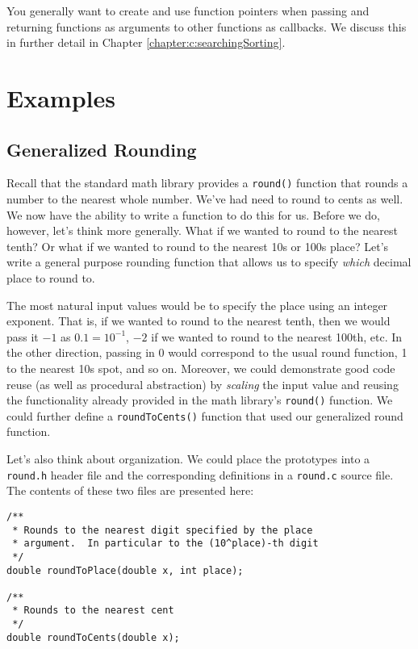 You generally want to create and use function pointers when
passing and returning functions as arguments to other
functions as callbacks.  We discuss this in further detail
in Chapter \ref{chapter:c:searchingSorting}.

\section{Examples}

\subsection{Generalized Rounding}

Recall that the standard math library provides a \texttt{round()}
function that rounds a number to the nearest whole number.  We've
had need to round to cents as well.  We now have the ability to write
a function to do this for us.  Before we do, however, let's think more
generally.  What if we wanted to round to the nearest tenth?  Or
what if we wanted to round to the nearest 10s or 100s place?  Let's
write a general purpose rounding function that allows us to specify
\emph{which} decimal place to round to.  

The most natural input values would be to specify the place using
an integer exponent.  That is, if we wanted to round to the nearest
tenth, then we would pass it $-1$ as $0.1 = 10^{-1}$, $-2$ if we wanted
to round to the nearest 100th, etc.  In the other direction, passing in 0
would correspond to the usual round function, 1 to the nearest 10s spot, 
and so on.  Moreover, we could demonstrate good code reuse (as well as 
 procedural
abstraction) by \emph{scaling} the input value and reusing the functionality
already provided in the math library's \texttt{round()} function.  We
could further define a \texttt{roundToCents()} function that used 
our generalized round function.

Let's also think about organization.  We could place the prototypes into
a \texttt{round.h} header file and the corresponding definitions
in a \texttt{round.c} source file.  The contents of these two
files are presented here:

\begin{verbatim}
/**
 * Rounds to the nearest digit specified by the place
 * argument.  In particular to the (10^place)-th digit
 */
double roundToPlace(double x, int place);

/**
 * Rounds to the nearest cent
 */
double roundToCents(double x);
\end{verbatim}

